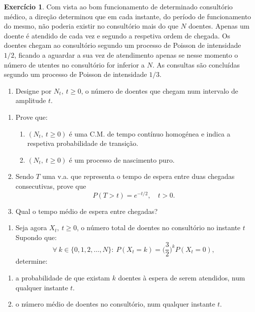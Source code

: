 \documentclass[
  11pt,
  a4paper,
]{book}
\providecommand{\tightlist}{%
  \setlength{\itemsep}{0pt}\setlength{\parskip}{0pt}}
\theoremstyle{definition}
\theoremstyle{definition}
\theoremstyle{definition}
\newtheorem{exercise}{Exercício}[chapter]
\theoremstyle{definition}
\theoremstyle{remark}
\begin{document}
\begin{exercise}
\leavevmode

Com vista ao bom funcionamento de determinado consultório médico, a direção determinou que em cada instante, do período de funcionamento do mesmo, não poderia existir no consultório mais do que \(N\) doentes. Apenas um doente é atendido de cada vez e segundo a respetiva ordem de chegada. Os doentes chegam ao consultório segundo um processo de Poisson de intensidade \(1/2\), ficando a aguardar a sua vez de atendimento apenas se nesse momento o número de utentes no consultório for inferior a \(N\). As consultas são concluídas segundo um processo de Poisson de intensidade \(1/3\).

\begin{enumerate}
\def\labelenumi{(\alph{enumi})}
\tightlist
\item
  Designe por \(N_t, ~t \geq 0\), o número de doentes que chegam num intervalo de amplitude \(t\).
\end{enumerate}

\begin{enumerate}
\def\labelenumi{\arabic{enumi}.}
\item
  Prove que:

  \begin{enumerate}
  \def\labelenumii{\roman{enumii}.}
  \item
    \((N_t, ~t \geq 0)\) é uma C.M. de tempo contínuo homogénea e indica a respetiva probabilidade de transição.
  \item
    \((N_t, ~t \geq 0)\) é um processo de nascimento puro.
  \end{enumerate}
\item
  Sendo \(T\) uma v.a. que representa o tempo de espera entre duas chegadas consecutivas, prove que
  \[P(T > t)=e^{-t/2}, \quad t > 0.\]
\item
  Qual o tempo médio de espera entre chegadas?
\end{enumerate}

\begin{enumerate}
\def\labelenumi{(\alph{enumi})}
\setcounter{enumi}{1}
\tightlist
\item
  Seja agora \(X_t, ~t \geq 0\), o número total de doentes no consultório no instante \(t\) Supondo que:
  \[\forall ~k \in \{0,1,2,\dots,N\}: ~P(X_t=k)=\big(\dfrac{3}{2}\big)^k P(X_t=0),\]
  determine:
\end{enumerate}

\begin{enumerate}
\def\labelenumi{\arabic{enumi}.}
\item
  a probabilidade de que existam \(k\) doentes à espera de serem atendidos, num qualquer instante \(t\).
\item
  o número médio de doentes no consultório, num qualquer instante \(t\).
\end{enumerate}

\end{exercise}
\end{document}
